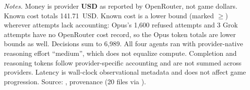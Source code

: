 \begin{landscape}
{\footnotesize\textit{Notes.} Money is provider \textbf{USD} as reported by OpenRouter, not game dollars. Known cost totals 141.71~USD. Known cost is a lower bound (marked $\geq$) wherever attempts lack accounting: Opus's 1,600 refused attempts and 3 Grok attempts have no OpenRouter cost record, so the Opus token totals are lower bounds as well. Decisions sum to 6,989. All four agents ran with provider-native reasoning effort ``medium'', which does not equalize compute. Completion and reasoning tokens follow provider-specific accounting and are not summed across providers. Latency is wall-clock observational metadata and does not affect game progression. Source: , provenance  (20  files via ).\par}

\end{landscape}
